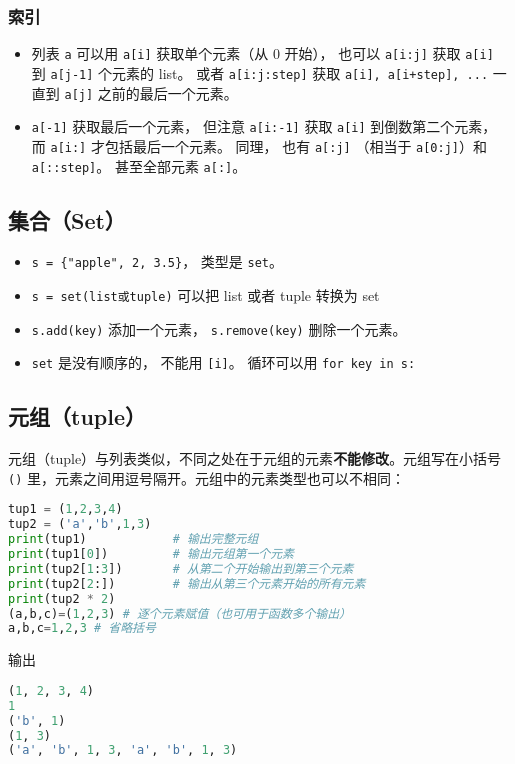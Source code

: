 \subsubsection{索引}
\begin{itemize}
\item 列表 \verb`a` 可以用 \verb`a[i]` 获取单个元素（从 0 开始）， 也可以 \verb`a[i:j]` 获取 \verb`a[i]` 到 \verb`a[j-1]` 个元素的 list。 或者 \verb`a[i:j:step]` 获取 \verb`a[i], a[i+step], ...` 一直到 \verb`a[j]` 之前的最后一个元素。 
\item \verb`a[-1]` 获取最后一个元素， 但注意 \verb`a[i:-1]` 获取 \verb`a[i]` 到倒数第二个元素， 而 \verb`a[i:]` 才包括最后一个元素。 同理， 也有 \verb`a[:j]` （相当于 \verb`a[0:j]`）和 \verb`a[::step]`。 甚至全部元素 \verb`a[:]`。
\end{itemize}


\subsection{集合（Set）}
\begin{itemize}
\item \verb`s = {"apple", 2, 3.5}`， 类型是 \verb`set`。 
\item \verb`s = set(list或tuple)` 可以把 list 或者 tuple 转换为 set
\item \verb`s.add(key)` 添加一个元素， \verb`s.remove(key)` 删除一个元素。
\item \verb`set` 是没有顺序的， 不能用 \verb`[i]`。 循环可以用 \verb`for key in s:`
\end{itemize}


\subsection{元组（tuple）}
元组（tuple）与列表类似，不同之处在于元组的元素\textbf{不能修改}。元组写在小括号 \verb`()` 里，元素之间用逗号隔开。元组中的元素类型也可以不相同：
\begin{lstlisting}[language=python]
tup1 = (1,2,3,4)
tup2 = ('a','b',1,3)
print(tup1)            # 输出完整元组
print(tup1[0])         # 输出元组第一个元素
print(tup2[1:3])       # 从第二个开始输出到第三个元素
print(tup2[2:])        # 输出从第三个元素开始的所有元素
print(tup2 * 2)
(a,b,c)=(1,2,3) # 逐个元素赋值（也可用于函数多个输出）
a,b,c=1,2,3 # 省略括号
\end{lstlisting}
输出
\begin{lstlisting}[language=python]
(1, 2, 3, 4)
1
('b', 1)
(1, 3)
('a', 'b', 1, 3, 'a', 'b', 1, 3)
\end{lstlisting}

